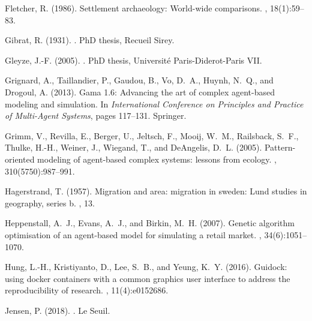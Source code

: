 \documentclass[10pt]{article}
\begin{document}
\begin{thebibliography}{}
Fletcher, R. (1986).
\newblock Settlement archaeology: World-wide comparisons.
, 18(1):59--83.

Gibrat, R. (1931).
.
\newblock PhD thesis, Recueil Sirey.

Gleyze, J.-F. (2005).
.
\newblock PhD thesis, Universit{\'e} Paris-Diderot-Paris VII.

Grignard, A., Taillandier, P., Gaudou, B., Vo, D.~A., Huynh, N.~Q., and
  Drogoul, A. (2013).
\newblock Gama 1.6: Advancing the art of complex agent-based modeling and
  simulation.
\newblock In {\em International Conference on Principles and Practice of
  Multi-Agent Systems}, pages 117--131. Springer.

Grimm, V., Revilla, E., Berger, U., Jeltsch, F., Mooij, W.~M., Railsback,
  S.~F., Thulke, H.-H., Weiner, J., Wiegand, T., and DeAngelis, D.~L. (2005).
\newblock Pattern-oriented modeling of agent-based complex systems: lessons
  from ecology.
, 310(5750):987--991.

Hagerstrand, T. (1957).
\newblock Migration and area: migration in sweden: Lund studies in geography,
  series b.
, 13.

Heppenstall, A.~J., Evans, A.~J., and Birkin, M.~H. (2007).
\newblock Genetic algorithm optimisation of an agent-based model for simulating
  a retail market.
,
  34(6):1051--1070.

Hung, L.-H., Kristiyanto, D., Lee, S.~B., and Yeung, K.~Y. (2016).
\newblock Guidock: using docker containers with a common graphics user
  interface to address the reproducibility of research.
, 11(4):e0152686.

Jensen, P. (2018).
.
\newblock Le Seuil.


\end{thebibliography}
\end{document}
